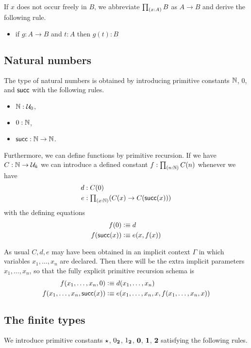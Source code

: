 If $x$ does not occur freely in $B$, we abbreviate $\tprd{x:A} B$ as $A
\rightarrow B$ and derive the following rule.

\begin{itemize}
\item if $g:A \rightarrow B$ and $t:A$ then $g(t):B$
\end{itemize}

\subsection{Natural numbers}

The type of natural numbers is obtained by introducing primitive constants
$\mathbb{N}$, $0$, and $\mathsf{succ}$ with the following rules.
\begin{itemize}
  \item $\mathbb{N} : \mathcal{U}_0$,
  \item $0:\mathbb{N}$,
  \item $\mathsf{succ}:\mathbb{N}\rightarrow \mathbb{N}$.
\end{itemize}

Furthermore, we can define functions by primitive recursion.  If we have
$C : \mathbb{N} \rightarrow \mathcal{U}_k $ we can introduce a defined constant $f:\tprd{n:\N}C(n)$ whenever we have
  \begin{align*}
    d & : C(0) \\
    e & : \tprd{x:\N}(C(x)\rightarrow C(\suc (x)))
  \end{align*}
with the defining equations
  \begin{align*}
    f(0) & \vcentcolon\equiv d \\
    f(\mathsf{succ} (x)) & \vcentcolon\equiv e(x,f(x))
  \end{align*}
 
As usual $C,d,e$ may have been obtained in an implicit context $\Gamma$ in which variables $x_1,\ldots,x_n$ are declared.  Then there will be the extra implicit parameters $x_1,\ldots,x_n$, so that the fully explicit primitive recursion schema is
  \begin{align*}
    f(x_1,\dots,x_n,0) & \vcentcolon\equiv d(x_1,\dots,x_n) \\
    f(x_1,\dots,x_n,\mathsf{succ} (x)) & \vcentcolon\equiv e(x_1,\dots,x_n,x,f(x_1,\dots,x_n,x))
  \end{align*}

\subsection{The finite types}

We introduce primitive constants $\star$, ${0_{\mathbf{2}}}$, ${1_{\mathbf{2}}}$, $\mathbf{0}$,
$\mathbf{1}$, $\mathbf{2}$ satisfying the following rules.

